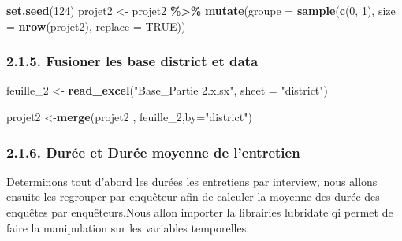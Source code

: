 \documentclass[
]{article}
\newenvironment{Shaded}{\begin{snugshade}}{\end{snugshade}}
\newcommand{\AttributeTok}[1]{\textcolor[rgb]{0.13,0.29,0.53}{#1}}
\newcommand{\ConstantTok}[1]{\textcolor[rgb]{0.56,0.35,0.01}{#1}}
\newcommand{\DecValTok}[1]{\textcolor[rgb]{0.00,0.00,0.81}{#1}}
\newcommand{\FunctionTok}[1]{\textcolor[rgb]{0.13,0.29,0.53}{\textbf{#1}}}
\newcommand{\NormalTok}[1]{#1}
\newcommand{\OtherTok}[1]{\textcolor[rgb]{0.56,0.35,0.01}{#1}}
\newcommand{\SpecialCharTok}[1]{\textcolor[rgb]{0.81,0.36,0.00}{\textbf{#1}}}
\newcommand{\StringTok}[1]{\textcolor[rgb]{0.31,0.60,0.02}{#1}}
\begin{document}
\begin{Shaded}
\begin{Highlighting}[]
\FunctionTok{set.seed}\NormalTok{(}\DecValTok{124}\NormalTok{)}
\NormalTok{projet2 }\OtherTok{\textless{}{-}}\NormalTok{ projet2 }\SpecialCharTok{\%\textgreater{}\%}
  \FunctionTok{mutate}\NormalTok{(}\AttributeTok{groupe =} \FunctionTok{sample}\NormalTok{(}\FunctionTok{c}\NormalTok{(}\DecValTok{0}\NormalTok{, }\DecValTok{1}\NormalTok{), }\AttributeTok{size =} \FunctionTok{nrow}\NormalTok{(projet2), }
                         \AttributeTok{replace =} \ConstantTok{TRUE}\NormalTok{))}
\end{Highlighting}
\end{Shaded}

\hypertarget{fusioner-les-base-district-et-data}{%
\subsubsection{2.1.5. Fusioner les base district et
data}\label{fusioner-les-base-district-et-data}}

\begin{Shaded}
\begin{Highlighting}[]
\NormalTok{feuille\_2 }\OtherTok{\textless{}{-}} \FunctionTok{read\_excel}\NormalTok{(}\StringTok{"Base\_Partie 2.xlsx"}\NormalTok{, }
    \AttributeTok{sheet =} \StringTok{"district"}\NormalTok{)}

\NormalTok{projet2 }\OtherTok{\textless{}{-}}\FunctionTok{merge}\NormalTok{(projet2 , feuille\_2,}\AttributeTok{by=}\StringTok{"district"}\NormalTok{)}
\end{Highlighting}
\end{Shaded}

\hypertarget{duruxe9e-et-duruxe9e-moyenne-de-lentretien}{%
\subsubsection{2.1.6. Durée et Durée moyenne de
l'entretien}\label{duruxe9e-et-duruxe9e-moyenne-de-lentretien}}

Determinons tout d'abord les durées les entretiens par interview, nous
allons ensuite les regrouper par enquêteur afin de calculer la moyenne
des durée des enquêtes par enquêteurs.Nous allon importer la librairies
lubridate qi permet de faire la manipulation sur les variables
temporelles.
\end{document}
